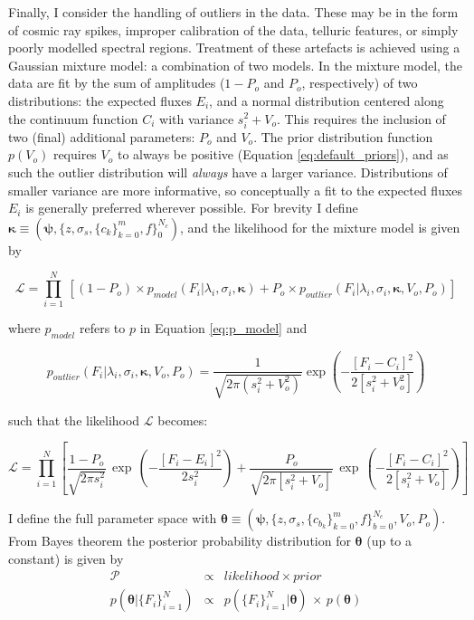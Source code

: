 \documentclass{aastex}
\begin{document}
Finally, I consider the handling of outliers in the data. These may be in the form of cosmic ray spikes, improper calibration of the data, telluric features, or simply poorly modelled spectral regions. Treatment of these artefacts is achieved using a Gaussian mixture model: a combination of two models. In the mixture model, the data are fit by the sum of amplitudes ($1 - P_o$ and $P_o$, respectively) of two distributions: the expected fluxes $E_i$, and a normal distribution centered along the continuum function $C_i$ with variance $s_{i}^2 + V_{o}$. This requires the inclusion of two (final) additional parameters: $P_o$ and $V_o$. The prior distribution function $p\left(V_o\right)$ requires $V_{o}$ to always be positive (Equation \ref{eq:default_priors}), and as such the outlier distribution will \textit{always} have a larger variance. Distributions of smaller variance are more informative, so conceptually a fit to the expected fluxes $E_{i}$ is generally preferred wherever possible. For brevity I define $\bm{\kappa} \equiv (\bm{\psi},\{z,\sigma_s,\{c_k\}_{k=0}^{m},f\}_{0}^{N_{c}})$, and the likelihood for the mixture model is given by
 
 \begin{equation}
\mathcal{L} = \prod_{i=1}^{N}\,\left[\left(1 - P_{o}\right)\times{}p_{model}\left(F_i|\lambda_i,\sigma_{i},\bm{\kappa}\right) + P_{o}\times{}p_{outlier}\left(F_i|\lambda_i,\sigma_i,\bm{\kappa},V_{o},P_o\right)\right]
\end{equation}
 
\noindent{}where $p_{model}$ refers to $p$ in Equation \ref{eq:p_model} and 

\begin{equation}
p_{outlier}\left(F_i|\lambda_i,\sigma_i,\bm{\kappa},V_{o},P_o\right) = \frac{1}{\sqrt{2\pi\left(s_{i}^2 + V_{o}^2\right)}} \exp\left(-\frac{[F_i - C_i]^2}{2\left[s_{i}^2 + V_{o}^2\right]}\right)
\end{equation}

\noindent{}such that the likelihood $\mathcal{L}$ becomes:

\begin{equation}
\mathcal{L} = \prod_{i=1}^{N} \left[ \frac{1-P_o}{\sqrt{2\pi{}s_{i}^2}}\,\exp\,\left(-\frac{[F_i - E_i]^2}{2s_{i}^{2}}\right) + \frac{P_o}{\sqrt{2\pi\left[s_{i}^2 + V_o\right]}}\,\exp\,\left(-\frac{[F_i - C_i]^2}{2\left[s_{i}^{2} + V_o\right]}\right)\right]
\label{eq:full_likelihood}
\end{equation}

I define the full parameter space with $\bm{\theta} \equiv \left(\bm{\psi},\{z,\sigma_s,\{c_{b_k}\}_{k=0}^{m},f\}_{b=0}^{N_{c}},V_o,P_o\right)$. From Bayes theorem the posterior probability distribution for $\bm{\theta}$ (up to a constant) is given by
\begin{eqnarray}
\mathcal{P} & \propto & likelihood \times prior \nonumber \\
p(\bm{\theta}|\{F_i\}_{i=1}^{N}) & \propto & p(\{F_i\}_{i=1}^{N}|\bm{\theta})\,\times\,p(\bm{\theta})
\label{eq:probability}
\end{eqnarray}
\end{document}
